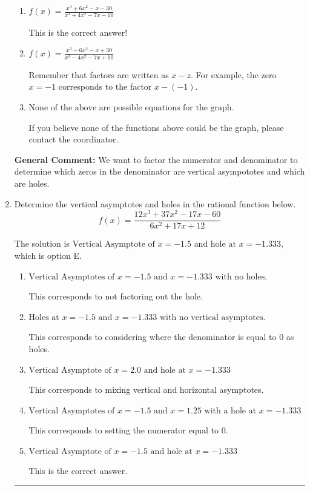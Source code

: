 \documentclass{extbook}[14pt]
\newcommand{\litem}[1]{\item #1

\rule{\textwidth}{0.4pt}}
\begin{document}
\begin{enumerate}
{\begin{enumerate}[label=\Alph*.]
You treated all of the zeros in the denominator as vertical asmptotes when some of them were holes and wrote factors as $x+z$.
\item \( f(x)=\frac{x^{3} +6 x^{2} -x -30}{x^{3} +4 x^{2} -7 x -10} \)

This is the correct answer!
\item \( f(x)=\frac{x^{3} -6 x^{2} -x + 30}{x^{3} -4 x^{2} -7 x + 10} \)

Remember that factors are written as $x-z$. For example, the zero $x=-1$ corresponds to the factor $x-(-1)$.
\item \( \text{None of the above are possible equations for the graph.} \)

If you believe none of the functions above could be the graph, please contact the coordinator.
\end{enumerate}

\textbf{General Comment:} We want to factor the numerator and denominator to determine which zeros in the denominator are vertical asympototes and which are holes.
}
\litem{
Determine the vertical asymptotes and holes in the rational function below.
\[ f(x) = \frac{12x^{3} +37 x^{2} -17 x -60}{6x^{2} +17 x + 12} \]

The solution is \( \text{Vertical Asymptote of } x = -1.5 \text{ and hole at } x = -1.333 \), which is option E.\begin{enumerate}[label=\Alph*.]
\item \( \text{Vertical Asymptotes of } x = -1.5 \text{ and } x = -1.333 \text{ with no holes.} \)

This corresponds to not factoring out the hole.
\item \( \text{Holes at } x = -1.5 \text{ and } x = -1.333 \text{ with no vertical asymptotes.} \)

This corresponds to considering where the denominator is equal to 0 as holes.
\item \( \text{Vertical Asymptote of } x = 2.0 \text{ and hole at } x = -1.333 \)

This corresponds to mixing vertical and horizontal asymptotes.
\item \( \text{Vertical Asymptotes of } x = -1.5 \text{ and } x = 1.25 \text{ with a hole at } x = -1.333 \)

This corresponds to setting the numerator equal to 0.
\item \( \text{Vertical Asymptote of } x = -1.5 \text{ and hole at } x = -1.333 \)

This is the correct answer.
\end{enumerate}

}
\end{enumerate}
\end{document}
